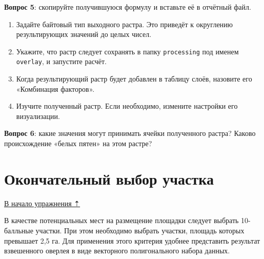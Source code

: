 \documentclass[
  12pt,
]{book}
\begin{document}
\textbf{Вопрос 5}: скопируйте получившуюся формулу и вставьте её в отчётный файл.

\begin{enumerate}
\def\labelenumi{\arabic{enumi}.}
\setcounter{enumi}{3}
\item
  Задайте байтовый тип выходного растра. Это приведёт к округлению результирующих значений до целых чисел.
\item
  Укажите, что растр следует сохранять в папку \texttt{processing} под именем \texttt{overlay}, и запустите расчёт.
\item
  Когда результирующий растр будет добавлен в таблицу слоёв, назовите его «Комбинация факторов».
\item
  Изучите полученный растр. Если необходимо, измените настройки его визуализации.
\end{enumerate}

\textbf{Вопрос 6}: какие значения могут принимать ячейки полученного растра? Каково происхождение «белых пятен» на этом растре?

\hypertarget{weighted-overlay-final-decision}{%
\section{Окончательный выбор участка}\label{weighted-overlay-final-decision}}

\protect\hyperlink{weighted-overlay}{В начало упражнения ⇡}

В качестве потенциальных мест на размещение площадки следует выбрать 10-балльные участки. При этом необходимо выбрать участки, площадь которых превышает 2,5 га. Для применения этого критерия удобнее представить результат взвешенного оверлея в виде векторного полигонального набора данных.
\end{document}
